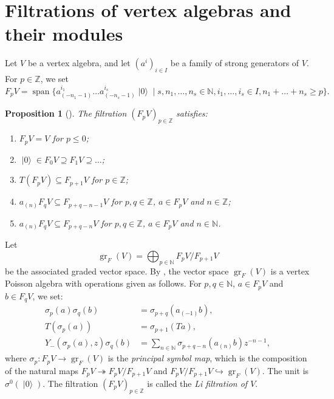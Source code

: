 \documentclass[a4paper, 12pt, reqno]{amsart}
\newtheorem{proposition}[theorem]{Proposition}
\theoremstyle{remark}
\DeclareMathOperator{\vac}{|0\rangle}
\DeclareMathOperator{\gr}{gr}
\DeclareMathOperator{\vspan}{span}
\begin{document}
\section{Filtrations of vertex algebras and their modules}
\label{sec:filtr-vert-algebr}

Let $V$ be a vertex algebra, and let $(a^i)_{i \in I}$ be a family of strong generators of $V$.
For $p \in \mathbb{Z}$, we set
\begin{equation*}
  F_pV = \vspan\{a^{i_1}_{(-n_1 - 1)}\dots a^{i_s}_{(-n_s - 1)}\vac \mid s, n_1, \dots, n_s \in \mathbb{N}, i_1, \dots, i_s \in I, n_1 + \dots + n_s \ge p\}.
\end{equation*}

\begin{proposition}[{\cite{li_abelianizing_2005}}]
  \label{prp:5}
  The filtration $(F_pV)_{p \in \mathbb{Z}}$ satisfies:
  \begin{enumerate}
  \item $F_pV = V$ for $p \le 0$;
  \item $\vac \in F_0V \supseteq F_1V \supseteq \dots$;
  \item $T(F_pV) \subseteq F_{p + 1}V$ for $p \in \mathbb{Z}$;
  \item $a_{(n)}F_qV \subseteq F_{p + q - n - 1}V$ for $p, q \in \mathbb{Z}$, $a \in F_pV$ and $n \in \mathbb{Z}$;
  \item $a_{(n)}F_qV \subseteq F_{p + q - n}V$ for $p, q \in \mathbb{Z}$, $a \in F_pV$ and $n \in \mathbb{N}$.
  \end{enumerate}
\end{proposition}

Let
\begin{equation*}
  \gr_F(V) = \bigoplus_{p \in \mathbb{N}}F_pV/F_{p + 1}V
\end{equation*}
be the associated graded vector space.
By \cite{li_abelianizing_2005}, the vector space $\gr_F(V)$ is a vertex Poisson algebra with operations given as follows.
For $p, q \in \mathbb{N}$, $a \in F_pV$ and $b \in F_qV$, we set:
\begin{align*}
  \sigma_p(a)\sigma_q(b) &= \sigma_{p + q}(a_{(-1)}b), \\
  T(\sigma_p(a)) &= \sigma_{p + 1}(Ta), \\
  Y_-(\sigma_p(a), z)\sigma_q(b) &= \sum_{n \in \mathbb{N}}\sigma_{p + q - n}(a_{(n)}b)z^{-n - 1},
\end{align*}
where $\sigma_p: F_pV \to \gr_F(V)$ is the \emph{principal symbol map}, which is the composition of the natural maps $F_pV \twoheadrightarrow F_pV/F_{p + 1}V$ and $F_pV/F_{p + 1}V \hookrightarrow \gr_F(V)$.
The unit is $\sigma^0(\vac)$.
The filtration $(F_pV)_{p \in \mathbb{Z}}$ is called the \emph{Li filtration of $V$}.
\end{document}
